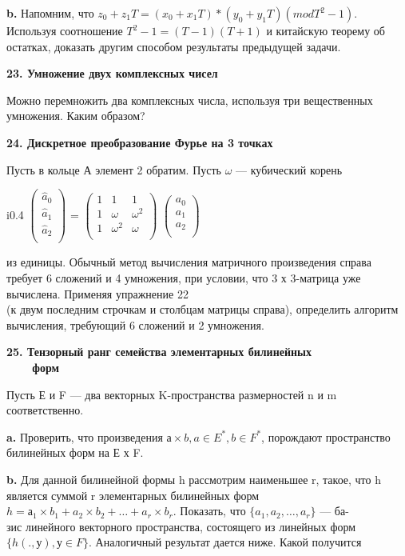 \documentclass{mai_book}
\begin{document}
\textbf{b.} Напомним, что $z_{0}+z_{1}T = (x_{0} + x_{1}T)*(y_{0}+y_{1}T) (mod T^{2} - 1)$. Используя соотношение $T^{2} - 1 = (T - 1)(T + 1)$ и китайскую теорему об остатках, доказать другим способом результаты предыдущей задачи.

\medskip
\noindent
\textbf{23. Умножение двух комплексных чисел}

\medskip
Можно перемножить два комплексных числа, используя три вещественных умножения. Каким образом?

\medskip
\noindent
\textbf{24. Дискретное преобразование Фурье на 3 точках}

\medskip
Пусть в кольце $А$ элемент 2 обратим. Пусть $\omega$ — кубический корень
\begin{wrapfigure}{i}{0.4\textwidth}
$\begin{pmatrix}
\hat{a}_{0} \\
\hat{a}_{1} \\
\hat{a}_{2} \\
\end{pmatrix}$ = $\begin{pmatrix}
1&1&1 \\
1&\omega&\omega^{2} \\
1&\omega^2&\omega \\
\end{pmatrix}$ $\begin{pmatrix}
a_0 \\
a_1 \\
a_2 \\
\end{pmatrix}$ 
\end{wrapfigure}
из единицы. Обычный метод вычисления матричного произведения справа требует 6 сложений и 4 умножения, при условии, что 3 х 3-матрица уже вычислена. Применяя упражнение 22 \\
(к двум последним строчкам и столбцам матрицы справа), определить алгоритм вычисления, требующий 6 сложений и 2 умножения.

\medskip
\noindent
\textbf{25. Тензорный ранг семейства элементарных билинейных\\
${}$ ${}$  ${}$ ${}$  ${}$ ${}$ форм}

\medskip
Пусть Е и F — два векторных K-пространства размерностей n и m соответственно.

\textbf{a.} Проверить, что произведения $а \times b, a \in E^{*}, b \in F^{*}$, порождают пространство билинейных форм на Е х F.

\textbf{b.} Для данной билинейной формы h рассмотрим наименьшее r, такое, что h является суммой r элементарных билинейных форм\\
$h = а_1 \times b_1 + a_2 \times b_2 + \dots + a_r \times b_r$. Показать, что $\{ a_1, a_2, \dots ,a_r \}$ --- ба-\\
зис линейного векторного пространства, состоящего из линейных форм\newline
$\{ h(.,у), у \in F \}$. Аналогичный результат дается ниже. Какой получится
\end{document}

